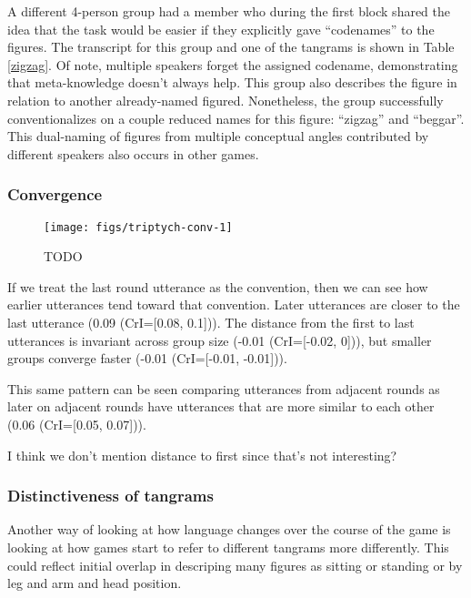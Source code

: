 \documentclass[
  english,
  a4paper,
]{article}
\begin{document}
A different 4-person group had a member who during the first block shared the idea that the task would be easier if they explicitly gave ``codenames'' to the figures. The transcript for this group and one of the tangrams is shown in Table \ref{zigzag}. Of note, multiple speakers forget the assigned codename, demonstrating that meta-knowledge doesn't always help. This group also describes the figure in relation to another already-named figured. Nonetheless, the group successfully conventionalizes on a couple reduced names for this figure: ``zigzag'' and ``beggar''. This dual-naming of figures from multiple conceptual angles contributed by different speakers also occurs in other games.

\hypertarget{convergence}{%
\subsubsection{Convergence}\label{convergence}}

\begin{figure*}[t!]

{\centering \texttt{[image: figs/triptych-conv-1]} 

}

\caption{TODO}\label{fig:triptych-conv}
\end{figure*}

If we treat the last round utterance as the convention, then we can see how earlier utterances tend toward that convention. Later utterances are closer to the last utterance (0.09 (CrI={[}0.08, 0.1{]})). The distance from the first to last utterances is invariant across group size (-0.01 (CrI={[}-0.02, 0{]})), but smaller groups converge faster (-0.01 (CrI={[}-0.01, -0.01{]})).

This same pattern can be seen comparing utterances from adjacent rounds as later on adjacent rounds have utterances that are more similar to each other (0.06 (CrI={[}0.05, 0.07{]})).

I think we don't mention distance to first since that's not interesting?

\hypertarget{distinctiveness-of-tangrams}{%
\subsubsection{Distinctiveness of tangrams}\label{distinctiveness-of-tangrams}}

Another way of looking at how language changes over the course of the game is looking at how games start to refer to different tangrams more differently. This could reflect initial overlap in descriping many figures as sitting or standing or by leg and arm and head position.
\end{document}
